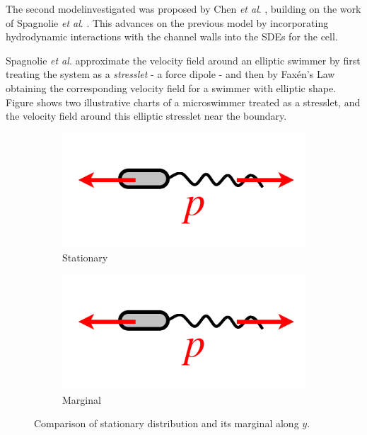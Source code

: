 The second modelinvestigated was proposed by Chen \textit{et al}. \cite{chen2021shape}, 
building on the work of Spagnolie \textit{et al}. 
\cite{spagnolie2015geometric}. This advances  on the previous model by incorporating hydrodynamic interactions
with the channel walls into the SDEs for the cell.

Spagnolie \textit{et al.} approximate the velocity field around an elliptic swimmer by first treating the system as a 
\textit{stresslet} - a force dipole - and then by Faxén's Law obtaining the corresponding velocity field for a 
swimmer with elliptic shape. Figure shows two illustrative charts of a microswimmer treated as a stresslet, and the 
velocity field around this elliptic stresslet near the boundary. 

\begin{figure}[htbp]
    \centering
    \begin{subfigure}[b]{0.45\textwidth}
        \centering
        \includegraphics[width=\textwidth]{graphics/pusher_pic.png}
        \caption{Stationary}
        \label{fig:pusher_chart}
    \end{subfigure}
    \hfill
    \begin{subfigure}[b]{0.45\textwidth}
        \centering
        \includegraphics[width=\textwidth]{graphics/pusher_pic.png}
        \caption{Marginal}
        \label{fig:fluid_field_pusher}
    \end{subfigure}
    \caption{Comparison of stationary distribution and its marginal along $y$.}
    \label{fig:model_2_intro}
\end{figure}

